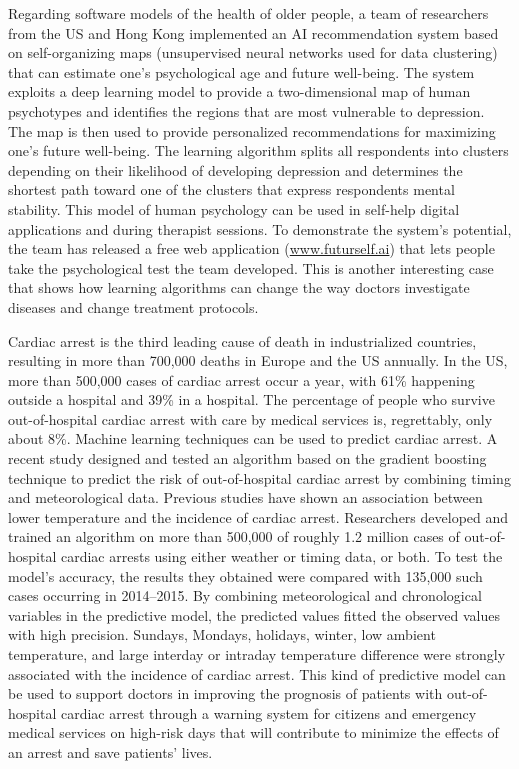 Regarding software models of the health of older people, a team of researchers from the US and Hong Kong implemented an AI recommendation system based on self-organizing maps (unsupervised neural networks used for data clustering) that can estimate one's psychological age and future well-being. The system exploits a deep learning model to provide a two-dimensional map of human psychotypes and identifies the regions that are most vulnerable to depression. The map is then used to provide personalized recommendations for maximizing one's future well-being. The learning algorithm splits all respondents into clusters depending on their likelihood of developing depression and determines the shortest path toward one of the clusters that express respondents mental stability. This model of human psychology can be used in self-help digital applications and during therapist sessions. To demonstrate the system's potential, the team has released a free web application (\href{https://www.futurself.ai/}{www.futurself.ai}) that lets people take the psychological test the team developed. This is another interesting case that shows how learning algorithms can change the way doctors investigate diseases and change treatment protocols.

Cardiac arrest is the third leading cause of death in industrialized countries, resulting in more than 700,000 deaths in Europe and the US annually. In the US, more than 500,000 cases of cardiac arrest occur a year, with 61\% happening outside a hospital and 39\% in a hospital. The percentage of people who survive out-of-hospital cardiac arrest with care by medical services is, regrettably, only about 8\%. Machine learning techniques can be used to predict cardiac arrest. A recent study designed and tested an algorithm based on the gradient\vadjust{\vspace*{-18pt}\pagebreak} boosting technique to \hbox{predict} the risk of out-of-hospital cardiac arrest by combining timing and meteorological data. Previous studies have shown an association between lower temperature and the incidence of cardiac arrest. Researchers developed and trained an algorithm on more than 500,000 of roughly 1.2 million cases of out-of-hospital cardiac arrests using either weather or timing data, or both. To test the model's accuracy, the results they obtained were compared with 135,000 such cases occurring in 2014--2015. By combining meteorological and chronological variables in the predictive model, the predicted values fitted the observed values with high precision. Sundays, Mondays, holidays, winter, low ambient temperature, and large interday or intraday temperature difference were strongly associated with the incidence of cardiac arrest. This kind of predictive model can be used to support doctors in improving the prognosis of patients with out-of-hospital cardiac arrest through a warning system for citizens and emergency medical services on high-risk days that will contribute to minimize the effects of an arrest and save patients' lives.

